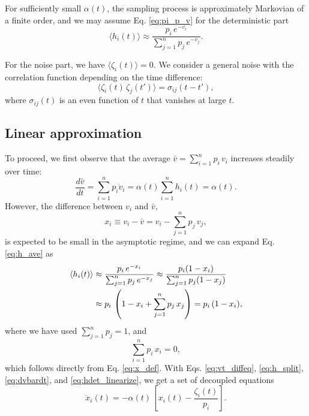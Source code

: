 \documentclass[reprint]{revtex4-1}
\begin{document}
For sufficiently small $\alpha(t)$,
the sampling process is approximately
Markovian of a finite order,
and we may assume Eq. \eqref{eq:pi_p_v}
for the deterministic part
%
\begin{equation}
  \langle h_i(t) \rangle
  \approx
  \frac{ p_i \, e^{-v_i} }
  { \sum_{j = 1}^n p_j \, e^{-v_j} }.
  \label{eq:h_ave}
\end{equation}



For the noise part, we have
$\langle \zeta_i(t) \rangle = 0$.
%
We consider a general noise with the correlation
function depending on the time difference:
%
\begin{equation}
  \langle \zeta_i(t) \, \zeta_j(t') \rangle
  =
  \sigma_{ij}(t - t'),
  \label{eq:zeta_zeta_correlation}
\end{equation}
%
where $\sigma_{ij}(t)$ is an even function of $t$
that vanishes at large $t$.



\subsection{Linear approximation}



To proceed, we first observe that
the average $\bar v = \sum_{i = 1}^n p_i \, v_i$
increases steadily over time:
%
\begin{equation}
\frac{ d \bar v } { d t }
=
\sum_{i = 1}^n p_i \dot v_i
=
\alpha(t) \sum_{i = 1}^n h_i(t) = \alpha(t).
\label{eq:dvbardt}
\end{equation}
%
However, the difference between $v_i$ and $\bar v$,
%
\begin{equation}
  x_i \equiv v_i - \bar v = v_i - \sum_{j = 1}^n p_j \, v_j,
  \label{eq:x_def}
\end{equation}
%
is expected to be small in the asymptotic regime,
and we can expand Eq. \eqref{eq:h_ave} as
\begin{align}
\langle h_i(t) \rangle
&\approx
\frac{ p_i \, e^{- x_i} }
{ \sum_{ j = 1}^n p_j \, e^{- x_j} }
\approx
\frac{ p_i ( 1 - x_i ) }
{ \sum_{ j = 1}^n p_j (1 - x_j) }
\notag \\
&\approx
p_i \, \left(
  1 - x_i + \sum_{j=1}^n p_j \, x_j
\right)
=
p_i \, (1 - x_i),
\label{eq:hdet_linearize}
\end{align}
where we have used $\sum_{j=1}^n p_j = 1$,
and
%
\begin{equation}
  \sum_{i = 1}^n p_i \, x_i = 0,
  \label{eq:px_sum}
\end{equation}
which follows directly from Eq. \eqref{eq:x_def}.
%
With Eqs.
\eqref{eq:vt_diffeq},
\eqref{eq:h_split},
\eqref{eq:dvbardt},
and
\eqref{eq:hdet_linearize},
we get a set of decoupled equations
%
\begin{equation}
  \dot x_i(t)
  =
  -\alpha(t) \, \left[ x_i(t) - \frac{ \zeta_i(t) } { p_i } \right].
  \label{eq:dxdt_WL}
\end{equation}
\end{document}
